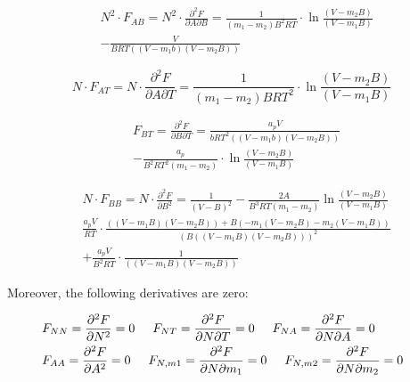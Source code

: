 \documentclass[a4paper, 12pt, english, sintefheadings, sintefcolour]{sintefmemo}
\begin{document}
\noindent\hrulefill


\begin{equation}
\begin{split}
&N^2\cdot F_{AB}=N^2\cdot\frac{\partial^2 F}{\partial A \partial B}=\frac{1}{(m_1-m_2)B^2RT}\cdot\ln{\frac{(V-m_2B)}{(V-m_1B)}} \\
&-\frac{V}{BRT((V-m_1b)(V-m_2B))}
\end{split}
\end{equation}

\noindent\hrulefill

\begin{equation}
N\cdot F_{AT}=N\cdot \frac{\partial^2 F}{\partial A \partial T}=\frac{1}{(m_1-m_2)BRT^2}\cdot\ln{\frac{(V-m_2B)}{(V-m_1B)}}
\end{equation}

\noindent\hrulefill

\begin{equation}
\begin{split}
&F_{BT}=\frac{\partial^2 F}{\partial B \partial T}=\frac{a_pV}{bRT^2((V-m_1b)(V-m_2B))} \\
&-\frac{a_p}{B^2RT^2(m_1-m_2)}\cdot\ln{\frac{(V-m_2B)}{(V-m_1B)}}
\end{split}
\end{equation}

\noindent\hrulefill

\begin{equation}
\begin{split}
&N\cdot F_{BB}=N\cdot\frac{\partial^2 F}{\partial B^2}=\frac{1}{(V-B)^2}-\frac{2A}{B^3RT(m_1-m_2)}\ln{\frac{(V-m_2B)}{(V-m_1B)}} \\
&\frac{a_pV}{RT}\cdot\frac{((V-m_1B)(V-m_2B))+B(-m_1(V-m_2B)-m_2(V-m_1B))}{(B((V-m_1B)(V-m_2B)))^2}\\
&+\frac{a_pV}{B^2RT}\cdot\frac{1}{((V-m_1B)(V-m_2B))}
\end{split}
\end{equation}

\noindent\hrulefill


Moreover, the following derivatives are zero:

\begin{equation}
\begin{split}
&F_{NN}=\frac{\partial^2 F}{\partial N^2}=0 \hspace{0.5cm} F_{NT}=\frac{\partial^2 F}{\partial N \partial T}=0 \hspace{0.5cm} F_{NA}=\frac{\partial^2 F}{\partial N \partial A}=0 \\
&F_{AA}=\frac{\partial^2 F}{\partial A^2}=0 \hspace{0.5cm} F_{N,m1}=\frac{\partial^2 F}{\partial N \partial m_1}=0\hspace{0.5cm} F_{N,m2}=\frac{\partial^2 F}{\partial N \partial m_2}=0\hspace{0.5cm} 
\end{split}
\end{equation}
\end{document}
